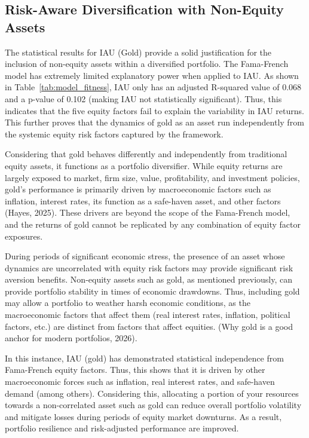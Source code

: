 \documentclass[12pt]{article}
\begin{document}
\subsection{Risk-Aware Diversification with Non-Equity Assets}

The statistical results for IAU (Gold) provide a solid justification for the inclusion of non-equity assets within a diversified portfolio. The Fama-French model has extremely limited explanatory power when applied to IAU. As shown in Table~\ref{tab:model_fitness}, IAU only has an adjusted R-squared value of 0.068 and a p-value of 0.102 (making IAU not statistically significant). Thus, this indicates that the five equity factors fail to explain the variability in IAU returns. This further proves that the dynamics of gold as an asset run independently from the systemic equity risk factors captured by the framework. 

Considering that gold behaves differently and independently from traditional equity assets, it functions as a portfolio diversifier. While equity returns are largely exposed to market, firm size, value, profitability, and investment policies, gold’s performance is primarily driven by macroeconomic factors such as inflation, interest rates, its function as a safe-haven asset, and other factors (Hayes, 2025). These drivers are beyond the scope of the Fama-French model, and the returns of gold cannot be replicated by any combination of equity factor exposures.

During periods of significant economic stress, the presence of an asset whose dynamics are uncorrelated with equity risk factors may provide significant risk aversion benefits. Non-equity assets such as gold, as mentioned previously, can provide portfolio stability in times of economic drawdowns. Thus, including gold may allow a portfolio to weather harsh economic conditions, as the macroeconomic factors that affect them (real interest rates, inflation, political factors, etc.) are distinct from factors that affect equities. (Why gold is a good anchor for modern portfolios, 2026). 

In this instance, IAU (gold) has demonstrated statistical independence from Fama-French equity factors. Thus, this shows that it is driven by other macroeconomic forces such as inflation, real interest rates, and safe-haven demand (among others). Considering this, allocating a portion of your resources towards a non-correlated asset such as gold can reduce overall portfolio volatility and mitigate losses during periods of equity market downturns. As a result, portfolio resilience and risk-adjusted performance are improved.
\end{document}
